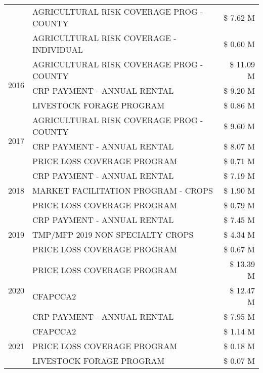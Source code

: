 \begin{tabular}{llr}
 & AGRICULTURAL RISK COVERAGE PROG - COUNTY & \$ 7.62 M \\
 & AGRICULTURAL RISK COVERAGE - INDIVIDUAL & \$ 0.60 M \\
\cline{1-3}
\multirow[t]{3}{*}{2016} & AGRICULTURAL RISK COVERAGE PROG - COUNTY & \$ 11.09 M \\
 & CRP PAYMENT - ANNUAL RENTAL & \$ 9.20 M \\
 & LIVESTOCK FORAGE PROGRAM & \$ 0.86 M \\
\cline{1-3}
\multirow[t]{3}{*}{2017} & AGRICULTURAL RISK COVERAGE PROG - COUNTY & \$ 9.60 M \\
 & CRP PAYMENT - ANNUAL RENTAL & \$ 8.07 M \\
 & PRICE LOSS COVERAGE PROGRAM & \$ 0.71 M \\
\cline{1-3}
\multirow[t]{3}{*}{2018} & CRP PAYMENT - ANNUAL RENTAL & \$ 7.19 M \\
 & MARKET FACILITATION PROGRAM - CROPS & \$ 1.90 M \\
 & PRICE LOSS COVERAGE PROGRAM & \$ 0.79 M \\
\cline{1-3}
\multirow[t]{3}{*}{2019} & CRP PAYMENT - ANNUAL RENTAL & \$ 7.45 M \\
 & TMP/MFP 2019 NON SPECIALTY CROPS & \$ 4.34 M \\
 & PRICE LOSS COVERAGE PROGRAM & \$ 0.67 M \\
\cline{1-3}
\multirow[t]{3}{*}{2020} & PRICE LOSS COVERAGE PROGRAM & \$ 13.39 M \\
 & CFAPCCA2 & \$ 12.47 M \\
 & CRP PAYMENT - ANNUAL RENTAL & \$ 7.95 M \\
\cline{1-3}
\multirow[t]{3}{*}{2021} & CFAPCCA2 & \$ 1.14 M \\
 & PRICE LOSS COVERAGE PROGRAM & \$ 0.18 M \\
 & LIVESTOCK FORAGE PROGRAM & \$ 0.07 M \\
\cline{1-3}
\bottomrule
\end{tabular}
